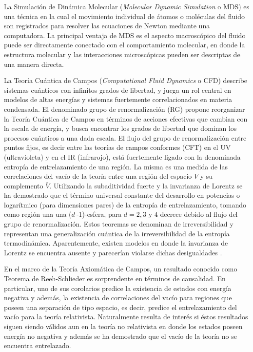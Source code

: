 La Simulación de Dinámica Molecular (\textit{Molecular Dynamic Simulation} o MDS) es una técnica en la cual el movimiento individual de átomos o moléculas del fluido son registrados para resolver las ecuaciones de Newton mediante una computadora. La principal ventaja de MDS es el aspecto macroscópico del fluido puede ser directamente conectado con el comportamiento molecular, en donde la estructura molecular y las interacciones microscópicas pueden ser descriptas de una manera directa.




La Teoría Cuántica de Campos (\textit{Computational Fluid Dynamics} o CFD) describe sistemas cuánticos con infinitos grados de libertad, y juega un rol central en modelos de altas energías y sistemas fuertemente correlacionados en materia condensada. El denominado grupo de renormalización (RG) propone reorganizar la Teoría Cuántica de Campos en términos de acciones efectivas que cambian con la escala de energía, y busca encontrar los grados de libertad que dominan los procesos cuánticos a una dada escala\cite{Wilson:1973jj}. El flujo del grupo de renormalización entre puntos fijos, es decir entre las teorías de campos conformes (CFT) en el UV (ultravioleta) y en el IR (infrarojo), está fuertemente ligado con la denominada entropía de entrelazamiento de una región. La misma es una medida de las correlaciones del vacío de la teoría entre una región del espacio $V$ y su complemento $\bar{V}$\cite{Casini:2009sr}. Utilizando la subaditividad fuerte y la invarianza de Lorentz se ha demostrado que el término universal constante del desarrollo en potencias o logarítmico (para dimensiones pares) de la entropía de entrelazamiento, tomando como región una una ($d\:$-1)-esfera, para $d=2,3\text{ y }4$ decrece debido al flujo del grupo de renormalización\cite{Zamolodchikov:1986gt}\cite{Casini:2012ei}\cite{Casini:2017vbe}. Estos teoremas se denominan de irreversibilidad y representan una generalización cuántica de la irreversibilidad de la entropía termodinámica. Aparentemente, existen modelos en donde la invarianza de Lorentz se encuentra ausente y parecerían violarse dichas desigualdades \citep{Swingle:2014}.

En el marco de la Teoría Axiomática de Campos, un resultado conocido como Teorema de Reeh-Schlieder es sorprendente en términos de causalidad\cite{Wightman:2016}. En particular, uno de sus corolarios predice la existencia de estados con energía negativa y además, la existencia de correlaciones del vacío para regiones que poseen una separación de tipo espacio, es decir, predice el entrelazamiento del vacío para la teoría relativista\cite{Witten:2018lha}. Naturalmente resulta de interés si éstos resultados siguen siendo válidos aun en la teoría no relativista en donde los estados poseen energía no negativa y además se ha demostrado que el vacío de la teoría no se encuentra entrelazado\cite{Hason:2017flq}.\\

